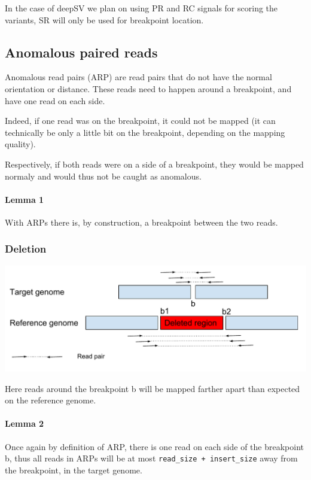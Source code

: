 \documentclass{article}
\begin{document}
In the case of deepSV we plan on using PR and RC signals for scoring the variants, SR will only
be used for breakpoint location.

\subsection{Anomalous paired reads}

Anomalous read pairs (ARP) are read pairs that do not have the normal orientation or distance.
These reads need to happen around a breakpoint, and have one read on each side.

Indeed, if one read was on the breakpoint, it could not be mapped (it can technically be only
a little bit on the breakpoint, depending on the mapping quality).

Respectively, if both reads were on a side of a breakpoint, they would be mapped normaly and would
thus not be caught as anomalous.

\paragraph{Lemma 1}  With ARPs there is, by construction, a breakpoint between the two reads.

\subsubsection{Deletion}

\includegraphics[width=\textwidth]{DeletionReadPairs}

Here reads around the breakpoint b will be mapped farther apart than expected on the reference
genome.

\paragraph{Lemma 2} Once again by definition of ARP, there is one read on each side of the breakpoint b, thus all reads in ARPs will be at most \verb|read_size + insert_size| away from the breakpoint, in the target genome.
\end{document}
